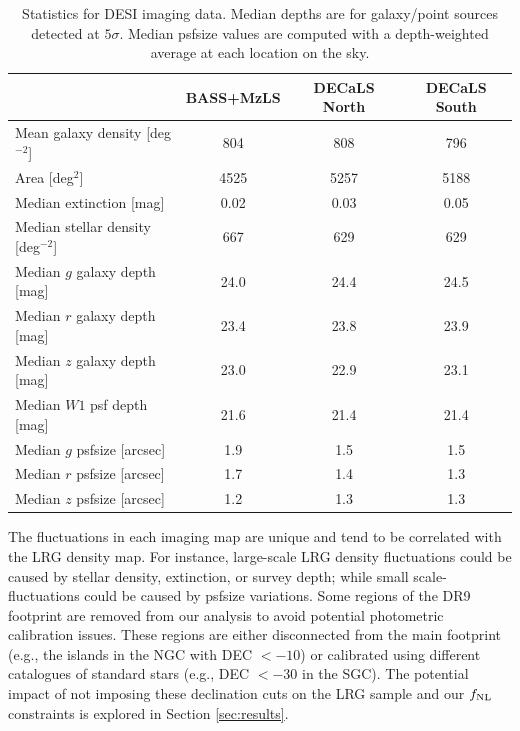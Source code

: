 \begin{table}
\caption{Statistics for DESI imaging data. Median depths are for galaxy/point sources detected at $5\sigma$. Median psfsize values are computed with a depth-weighted average at each location on the sky.}
\begin{center}
\begin{tabular}{lccc}
\hline
\hline
    & BASS+MzLS & DECaLS North & DECaLS South \\
\hline
\hline
Mean galaxy density [deg$^{-2}$]     & 804  & 808  & 796 \\
Area [deg$^2$]                       & 4525 & 5257 & 5188 \\
Median extinction [mag]              & 0.02 & 0.03 & 0.05\\
Median stellar density [deg$^{-2}$]  & 667  & 629  & 629\\
Median $g$ galaxy depth [mag]        & 24.0 & 24.4 & 24.5 \\
Median $r$ galaxy depth [mag]        & 23.4 & 23.8 & 23.9\\
Median $z$ galaxy depth [mag]        & 23.0 & 22.9 & 23.1\\
Median $W1$ psf depth [mag]          & 21.6 & 21.4 & 21.4\\
Median $g$ psfsize [arcsec]          & 1.9  & 1.5  & 1.5\\
Median $r$ psfsize [arcsec]          & 1.7  & 1.4  & 1.3\\
Median $z$ psfsize [arcsec]          & 1.2  & 1.3  & 1.3\\
\hline
\end{tabular}
\end{center}
\label{tab:imaging}
\end{table} 

The fluctuations in each imaging map are unique and tend to be correlated with the LRG density map. For instance, large-scale LRG density fluctuations could be caused by stellar density, extinction, or survey depth; while small scale-fluctuations could be caused by psfsize variations. Some regions of the DR9 footprint are removed from our analysis to avoid potential photometric calibration issues. These regions are either disconnected from the main footprint (e.g., the islands in the NGC with DEC $<-10$) or calibrated using different catalogues of standard stars (e.g., DEC $<-30$ in the SGC). The potential impact of not imposing these declination cuts on the LRG sample and our $f_{\rm NL}$ constraints is explored in Section \ref{sec:results}. 

